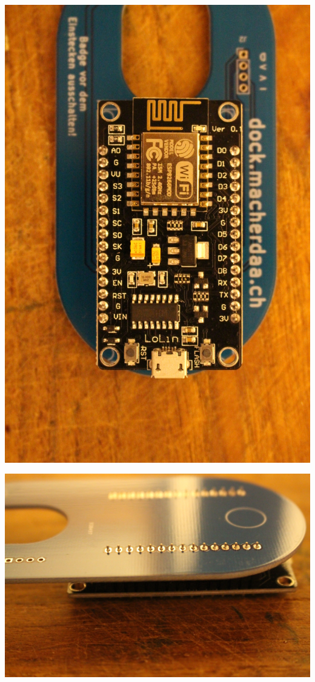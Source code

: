 \documentclass{article}
\begin{document}
\vspace{1cm}

\begin{minipage}[b]{0.5\textwidth}
	\includegraphics[width=\textwidth]{Bilder2019/IMG_6460.JPG}
\end{minipage}
\begin{minipage}[b]{0.5\textwidth}
	\includegraphics[width=\textwidth]{Bilder2019/IMG_6461.JPG}
\end{minipage}
\end{document}
